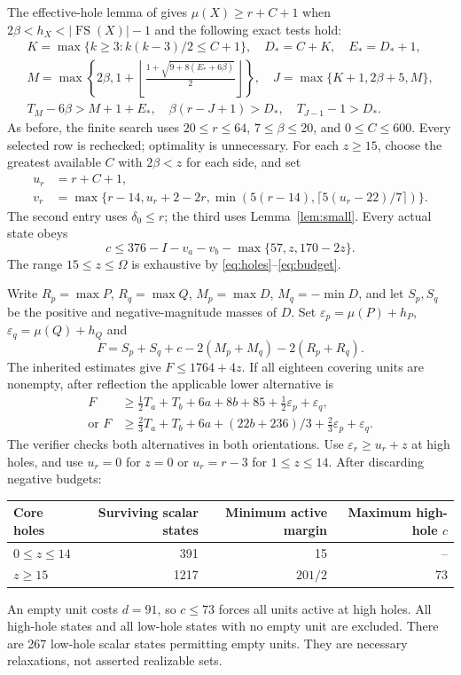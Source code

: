 \documentclass[11pt,a4paper]{article}
\newcommand{\FS}{\operatorname{FS}}
\begin{document}
The effective-hole lemma of \cite{base100} gives $\mu(X)\ge r+C+1$
when $2\beta<h_X<|\FS(X)|-1$ and the following exact tests hold:
\begin{gather*}
 K=\max\{k\ge3:k(k-3)/2\le C+1\},\quad D_*=C+K,\quad E_*=D_*+1,\\
 M=\max\left\{2\beta,1+\left\lfloor
 \frac{1+\sqrt{9+8(E_*+6\beta)}}2\right\rfloor\right\},\quad
 J=\max\{K+1,2\beta+5,M\},\\
 T_M-6\beta>M+1+E_*,\quad
 \beta(r-J+1)>D_*,\quad T_{J-1}-1>D_*.
\end{gather*}
As before, the finite search uses $20\le r\le64$, $7\le\beta\le20$,
and $0\le C\le600$. Every selected row is rechecked; optimality is
unnecessary. For each $z\ge15$, choose the greatest available $C$ with
$2\beta<z$ for each side, and set
\begin{align*}
 u_r&=r+C+1,\\
 v_r&=\max\{r-14,u_r+2-2r,
           \min(5(r-14),\lceil5(u_r-22)/7\rceil)\}.
\end{align*}
The second entry uses $\delta_0\le r$; the third uses Lemma~\ref{lem:small}.
Every actual state obeys
\begin{equation}\label{eq:cmax}
 c\le376-I-v_a-v_b-\max\{57,z,170-2z\}.
\end{equation}
The range $15\le z\le\Omega$ is exhaustive by \eqref{eq:holes}--\eqref{eq:budget}.

Write $R_p=\max P$, $R_q=\max Q$, $M_p=\max D$, $M_q=-\min D$,
and let $S_p,S_q$ be the positive and negative-magnitude masses of $D$.
Set $\varepsilon_p=\mu(P)+h_P$, $\varepsilon_q=\mu(Q)+h_Q$ and
\[
 F=S_p+S_q+c-2(M_p+M_q)-2(R_p+R_q).
\]
The inherited estimates give $F\le1764+4z$. If all eighteen covering
units are nonempty, after reflection the applicable lower alternative is
\begin{align*}
 F&\ge\tfrac12T_a+T_b+6a+8b+85
                  +\tfrac12\varepsilon_p+\varepsilon_q,\\
 \text{or }F&\ge\tfrac23T_a+T_b+6a+(22b+236)/3
                  +\tfrac23\varepsilon_p+\varepsilon_q.
\end{align*}
The verifier checks both alternatives in both orientations.
Use $\varepsilon_r\ge u_r+z$ at high holes, and use $u_r=0$ for $z=0$
or $u_r=r-3$ for $1\le z\le14$. After discarding negative budgets:
\begin{center}
\begin{tabular}{lrrr}
\toprule
Core holes&Surviving scalar states&Minimum active margin&Maximum high-hole $c$\\
\midrule
$0\le z\le14$&391&15&--\\
$z\ge15$&1217&$201/2$&73\\
\bottomrule
\end{tabular}
\end{center}
An empty unit costs $d=91$, so $c\le73$ forces all units active at high
holes. All high-hole states and all low-hole states with no empty unit
are excluded. There are 267 low-hole scalar states permitting empty
units. They are necessary relaxations, not asserted realizable sets.
\end{document}
